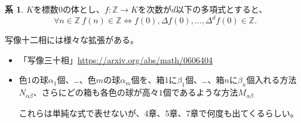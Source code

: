 \documentclass[xelatex,ja=standard,a4paper,14pt,everyparhook=compat]{bxjsarticle}
\newcommand{\bbZ}{\mathbb{Z}}
\theoremstyle{definition}
\newtheorem{corollary}[theorem]{系}
\begin{document}
\begin{corollary}
    $K$を標数$0$の体とし、$f:\bbZ \to K$を次数が$d$以下の多項式とすると、 \begin{equation*}
        \forall n \in \bbZ \ f(n) \in \bbZ \Longleftrightarrow f(0), \Delta f(0), \ldots, \Delta^d f(0) \in \bbZ.
    \end{equation*}
\end{corollary}

写像十二相には様々な拡張がある。
\begin{itemize}
    \item 「写像三十相」\url{https://arxiv.org/abs/math/0606404}
    \item 色$1$の球$\alpha_1$個、…、色$m$の球$\alpha_m$個を、箱$1$に$\beta_1$個、…、箱$n$に$\beta_n$個入れる方法$N_{\alpha\beta}$、さらにどの箱も各色の球が高々$1$個であるような方法$M_{\alpha\beta}$

    これらは単純な式で表せないが、4章、5章、7章で何度も出てくるらしい。
\end{itemize}
\end{document}
